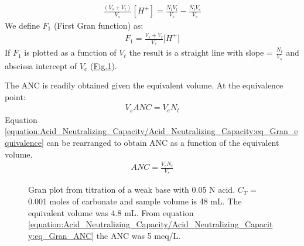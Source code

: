 \documentclass[letterpaper,10pt,english]{sphinxmanual}
\let\sphinxpxdimen\pdfpxdimen\else\newdimen\sphinxpxdimen
\begin{document}
\begin{equation}\label{equation:Acid_Neutralizing_Capacity/Acid_Neutralizing_Capacity:Acid_Neutralizing_Capacity/Acid_Neutralizing_Capacity:1}
\begin{split}\frac{\left(V_{s} +V_{t} \right)}{V_{s} } \left[H^{+} \right]=\frac{N_{t} V_{t} }{V_{s} } -\frac{N_{t} V_{e} }{V_{s} }\end{split}
\end{equation}
We define \(F_1\) (First Gran function) as:
\begin{equation}\label{equation:Acid_Neutralizing_Capacity/Acid_Neutralizing_Capacity:eq_Gran_F1}
\begin{split}F_1 = \frac{V_s +V_t }{V_s } {[H}^+ {]}\end{split}
\end{equation}
If \(F_1\) is plotted as a function of \(V_t\) the result is a straight line with slope = \(\frac{N_{t} }{V_{s} }\) and abscissa intercept of \(V_e\) (\hyperref[\detokenize{Acid_Neutralizing_Capacity/Acid_Neutralizing_Capacity:figure-gran-plot}]{Fig.\@ \ref{\detokenize{Acid_Neutralizing_Capacity/Acid_Neutralizing_Capacity:figure-gran-plot}}}).

The ANC is readily obtained given the equivalent volume. At the equivalence point:
\begin{equation}\label{equation:Acid_Neutralizing_Capacity/Acid_Neutralizing_Capacity:eq_Gran_equivalence}
\begin{split}V_s ANC= V_e N_t\end{split}
\end{equation}
Equation \eqref{equation:Acid_Neutralizing_Capacity/Acid_Neutralizing_Capacity:eq_Gran_equivalence} can be rearranged to obtain ANC as a function of the equivalent volume.
\begin{equation}\label{equation:Acid_Neutralizing_Capacity/Acid_Neutralizing_Capacity:eq_Gran_ANC}
\begin{split}ANC=\frac{V_e N_t }{V_s }\end{split}
\end{equation}
\begin{figure}[htbp]
\centering
\capstart

\noindent\sphinxincludegraphics[width=300\sphinxpxdimen]{{Gran_plot}.png}
\caption{Gran plot from titration of a weak base with 0.05 N acid. \(C_T\) = 0.001 moles of carbonate and sample volume is 48 mL. The equivalent volume was 4.8 mL. From equation  \eqref{equation:Acid_Neutralizing_Capacity/Acid_Neutralizing_Capacity:eq_Gran_ANC} the ANC was 5 meq/L.}\label{\detokenize{Acid_Neutralizing_Capacity/Acid_Neutralizing_Capacity:id1}}\label{\detokenize{Acid_Neutralizing_Capacity/Acid_Neutralizing_Capacity:figure-gran-plot}}\end{figure}
\end{document}
